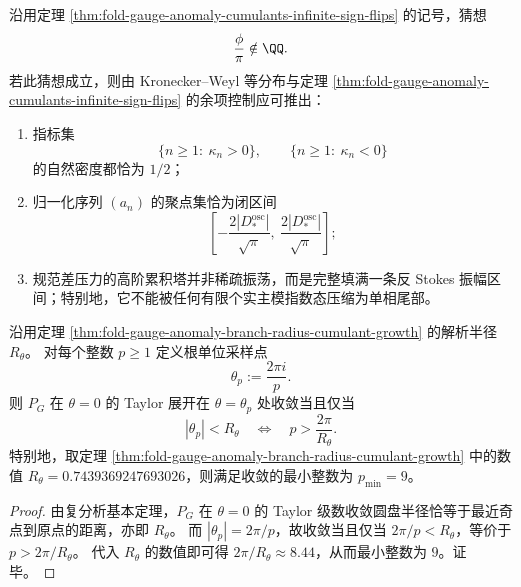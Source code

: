 \begin{conjecture}\label{conj:fold-gauge-anomaly-antistokes-angle-irrational-equidistribution}
沿用定理 \ref{thm:fold-gauge-anomaly-cumulants-infinite-sign-flips} 的记号，猜想
\[
\frac{\phi}{\pi}\notin\QQ.
\]
若此猜想成立，则由 Kronecker--Weyl 等分布与定理
\ref{thm:fold-gauge-anomaly-cumulants-infinite-sign-flips} 的余项控制应可推出：
\begin{enumerate}
  \item 指标集
  \[
  \{n\ge 1:\ \kappa_n>0\},
  \qquad
  \{n\ge 1:\ \kappa_n<0\}
  \]
  的自然密度都恰为 \(1/2\)；
  \item 归一化序列 \((a_n)\) 的聚点集恰为闭区间
  \[
  \left[
  -\frac{2|D_\ast^{\mathrm{osc}}|}{\sqrt\pi},
  \ \frac{2|D_\ast^{\mathrm{osc}}|}{\sqrt\pi}
  \right];
  \]
  \item 规范差压力的高阶累积塔并非稀疏振荡，而是完整填满一条反 Stokes 振幅区间；特别地，它不能被任何有限个实主模指数态压缩为单相尾部。
\end{enumerate}
\end{conjecture}

\begin{proposition}[根单位采样的最小收敛模数阈值]\label{prop:fold-gauge-anomaly-root-unit-sampling-threshold}
沿用定理 \ref{thm:fold-gauge-anomaly-branch-radius-cumulant-growth} 的解析半径 \(R_\theta\)。
对每个整数 \(p\ge 1\) 定义根单位采样点
\[
\theta_p:=\frac{2\pi i}{p}.
\]
则 \(P_G\) 在 \(\theta=0\) 的 Taylor 展开在 \(\theta=\theta_p\) 处收敛当且仅当
\[
|\theta_p|<R_\theta
\quad\Longleftrightarrow\quad
p>\frac{2\pi}{R_\theta}.
\]
特别地，取定理 \ref{thm:fold-gauge-anomaly-branch-radius-cumulant-growth} 中的数值
\(
R_\theta=0.7439369247693026
\)，则满足收敛的最小整数为 \(p_{\min}=9\)。
\end{proposition}
\begin{proof}
由复分析基本定理，\(P_G\) 在 \(\theta=0\) 的 Taylor 级数收敛圆盘半径恰等于最近奇点到原点的距离，亦即 \(R_\theta\)。
而 \(|\theta_p|=2\pi/p\)，故收敛当且仅当 \(2\pi/p<R_\theta\)，等价于 \(p>2\pi/R_\theta\)。
代入 \(R_\theta\) 的数值即可得 \(2\pi/R_\theta\approx 8.44\)，从而最小整数为 \(9\)。证毕。
\end{proof}

\endinput
